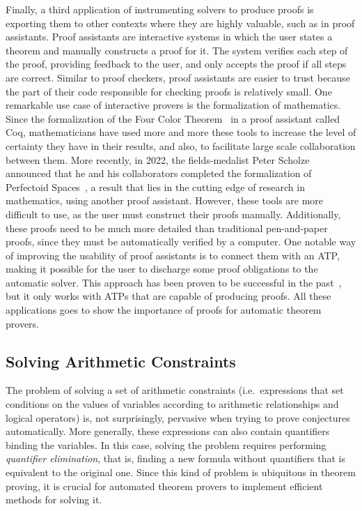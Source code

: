 \documentclass[a4paper, 12pt]{article}
\begin{document}
Finally, a third application of instrumenting solvers to produce proofs is exporting them to
other contexts where they are highly valuable, such as in proof assistants.
%
Proof assistants are interactive systems in which the user states a theorem and manually constructs
a proof for it. The system verifies each step of the proof, providing feedback to the user, and only
accepts the proof if all steps are correct.
%
Similar to proof checkers, proof assistants are easier to trust because the part of their code
responsible for checking proofs is relatively small.
%
One remarkable use case of interactive provers is the formalization of mathematics.
Since the formalization of the Four Color Theorem~\cite{fctCoq} in a proof assistant called Coq,
mathematicians have used more and more these tools to increase the level of certainty
they have in their results, and also, to facilitate large scale collaboration between them.
More recently, in 2022, the fields-medalist Peter Scholze announced that he and his collaborators
completed the formalization of Perfectoid Spaces~\cite{scholze}, a result that lies in the
cutting edge of research in mathematics, using another proof assistant.
%
However, these tools are more difficult to use, as the user must construct their proofs
manually. Additionally, these proofs need to be much more detailed than traditional pen-and-paper proofs,
since they must be automatically verified by a computer.
%
One notable way of improving the usability of proof assistants is to connect them with an ATP,
making it possible for the user to discharge some proof obligations to the automatic solver.
This approach has been proven to be successful in the past~\cite{coq2, reconstruct}, but it
only works with ATPs that are capable of producing proofs.
%
All these applications goes to show the importance of proofs for automatic theorem provers.


\subsection{Solving Arithmetic Constraints}

The problem of solving a set of arithmetic constraints (i.e.\ expressions that set conditions
on the values of variables according to arithmetic relationships and logical operators) is,
not surprisingly, pervasive when trying to prove conjectures automatically. More generally, these expressions
can also contain quantifiers binding the variables. In this case, solving the problem requires
performing \textit{quantifier elimination}, that is, finding a new formula without quantifiers
that is equivalent to the original one. Since this kind of problem is ubiquitous in theorem
proving, it is crucial for automated theorem provers to implement efficient methods for solving it.
\end{document}
